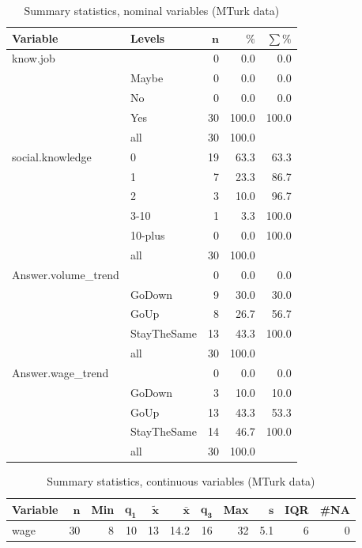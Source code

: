 \documentclass[a4paper,10pt]{article}\usepackage[]{graphicx}\usepackage[]{color}
\begin{document}
\begin{table}[ht]
\centering
{\footnotesize
\begin{tabular}{ll|rrr}
 \textbf{Variable} & \textbf{Levels} & $\mathbf{n}$ & $\mathbf{\%}$ & $\mathbf{\sum \%}$ \\ 
  \hline
know.job &  & 0 & 0.0 & 0.0 \\ 
   & Maybe & 0 & 0.0 & 0.0 \\ 
   & No & 0 & 0.0 & 0.0 \\ 
   & Yes & 30 & 100.0 & 100.0 \\ 
   \hline
 & all & 30 & 100.0 &  \\ 
   \hline
\hline
social.knowledge & 0 & 19 & 63.3 & 63.3 \\ 
   & 1 & 7 & 23.3 & 86.7 \\ 
   & 2 & 3 & 10.0 & 96.7 \\ 
   & 3-10 & 1 & 3.3 & 100.0 \\ 
   & 10-plus & 0 & 0.0 & 100.0 \\ 
   \hline
 & all & 30 & 100.0 &  \\ 
   \hline
\hline
Answer.volume\_trend &  & 0 & 0.0 & 0.0 \\ 
   & GoDown & 9 & 30.0 & 30.0 \\ 
   & GoUp & 8 & 26.7 & 56.7 \\ 
   & StayTheSame & 13 & 43.3 & 100.0 \\ 
   \hline
 & all & 30 & 100.0 &  \\ 
   \hline
\hline
Answer.wage\_trend &  & 0 & 0.0 & 0.0 \\ 
   & GoDown & 3 & 10.0 & 10.0 \\ 
   & GoUp & 13 & 43.3 & 53.3 \\ 
   & StayTheSame & 14 & 46.7 & 100.0 \\ 
   \hline
 & all & 30 & 100.0 &  \\ 
   \hline
\hline
\end{tabular}
}
\caption{Summary statistics, nominal variables (MTurk data)} 
\label{tab1:53-3020}
\end{table}
\begin{table}[ht]
\centering
{\footnotesize
\begin{tabular}{lrrrrrrrrrr}
 \textbf{Variable} & $\mathbf{n}$ & \textbf{Min} & $\mathbf{q_1}$ & $\mathbf{\widetilde{x}}$ & $\mathbf{\bar{x}}$ & $\mathbf{q_3}$ & \textbf{Max} & $\mathbf{s}$ & \textbf{IQR} & \textbf{\#NA} \\ 
  \hline
wage & 30 & 8 & 10 & 13 & 14.2 & 16 & 32 & 5.1 & 6 & 0 \\ 
  \end{tabular}
}
\caption{Summary statistics, continuous variables (MTurk data)} 
\label{tab2:53-3020}
\end{table}
\end{document}
